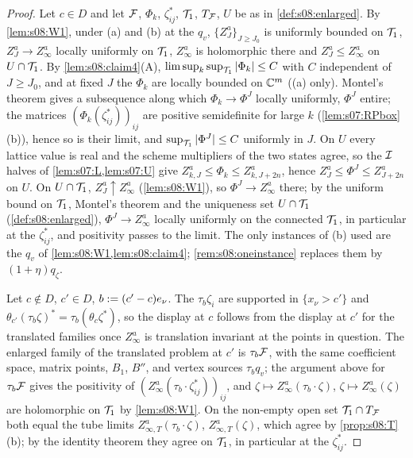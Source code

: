 \begin{proof}
Let $c\in D$ and let $\mathcal F$, $\Phi_k$, $\zeta^*_{ij}$, $\mathcal T_1$, $T_{\mathcal F}$, $U$ be as in \cref{def:s08:enlarged}. By \cref{lem:s08:W1}, under \Wtwo(a) and \Wtwo(b) at the $q_v$, $\{Z^a_J\}_{J\ge J_0}$ is uniformly bounded on $\mathcal T_1$, $Z^a_J\to Z^a_\infty$ locally uniformly on $\mathcal T_1$, $Z^a_\infty$ is holomorphic there and $Z^a_J\le Z^a_\infty$ on $U\cap\mathcal T_1$. By \cref{lem:s08:claim4}(A), $\limsup_k\sup_{\mathcal T_1}|\Phi_k|\le C$ with $C$ independent of $J\ge J_0$, and at fixed $J$ the $\Phi_k$ are locally bounded on $\mathbb C^m$ (\Wtwo(a) only). Montel's theorem gives a subsequence along which $\Phi_k\to\Phi^J$ locally uniformly, $\Phi^J$ entire; the matrices $(\Phi_k(\zeta^*_{ij}))_{ij}$ are positive semidefinite for large $k$ (\cref{lem:s07:RPbox}(b)), hence so is their limit, and $\sup_{\mathcal T_1}|\Phi^J|\le C$ uniformly in $J$. On $U$ every lattice value is real and the scheme multipliers of the two states agree, so the $\mathcal I$ halves of \cref{lem:s07:L,lem:s07:U} give $Z^a_{k,J}\le\Phi_k\le Z^a_{k,J+2n}$, hence $Z^a_J\le\Phi^J\le Z^a_{J+2n}$ on $U$. On $U\cap\mathcal T_1$, $Z^a_J\uparrow Z^a_\infty$ (\cref{lem:s08:W1}), so $\Phi^J\to Z^a_\infty$ there; by the uniform bound on $\mathcal T_1$, Montel's theorem and the uniqueness set $U\cap\mathcal T_1$ (\cref{def:s08:enlarged}), $\Phi^J\to Z^a_\infty$ locally uniformly on the connected $\mathcal T_1$, in particular at the $\zeta^*_{ij}$, and positivity passes to the limit. The only instances of \Wtwo(b) used are the $q_v$ of \cref{lem:s08:W1,lem:s08:claim4}; \cref{rem:s08:oneinstance} replaces them by $(1+\eta)q_\zeta$.

Let $c\notin D$, $c'\in D$, $b:=(c'-c)e_\nu$. The $\tau_b\zeta_i$ are supported in $\{x_\nu>c'\}$ and $\theta_{c'}(\tau_b\zeta)^*=\tau_b(\theta_c\zeta^*)$, so the display at $c$ follows from the display at $c'$ for the translated families once $Z^a_\infty$ is translation invariant at the points in question. The enlarged family of the translated problem at $c'$ is $\tau_b\mathcal F$, with the same coefficient space, matrix points, $B_1$, $B''$, and vertex sources $\tau_bq_v$; the argument above for $\tau_b\mathcal F$ gives the positivity of $(Z^a_\infty(\tau_b\cdot\zeta^*_{ij}))_{ij}$, and $\zeta\mapsto Z^a_\infty(\tau_b\cdot\zeta)$, $\zeta\mapsto Z^a_\infty(\zeta)$ are holomorphic on $\mathcal T_1$ by \cref{lem:s08:W1}. On the non-empty open set $\mathcal T_1\cap T_{\mathcal F}$ both equal the tube limits $Z^a_{\infty,T}(\tau_b\cdot\zeta)$, $Z^a_{\infty,T}(\zeta)$, which agree by \cref{prop:s08:T}(b); by the identity theorem they agree on $\mathcal T_1$, in particular at the $\zeta^*_{ij}$.
\end{proof}

